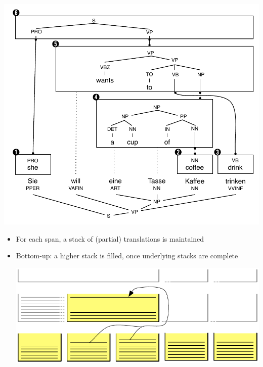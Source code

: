 \documentclass[landscape]{slides}
\begin{document}

\vspace{-31mm}
\begin{center}
\includegraphics[scale=1.15]{chart-parsing.pdf}
\end{center}


\vspace{10mm}
\begin{itemize}
\item For each span, a stack of (partial) translations is maintained
\item Bottom-up: a higher stack is filled, once underlying stacks are complete
\begin{center} 
\includegraphics[scale=1.3]{chart-stacks-color.pdf}\\
\end{center}
\end{itemize}
\end{document}
